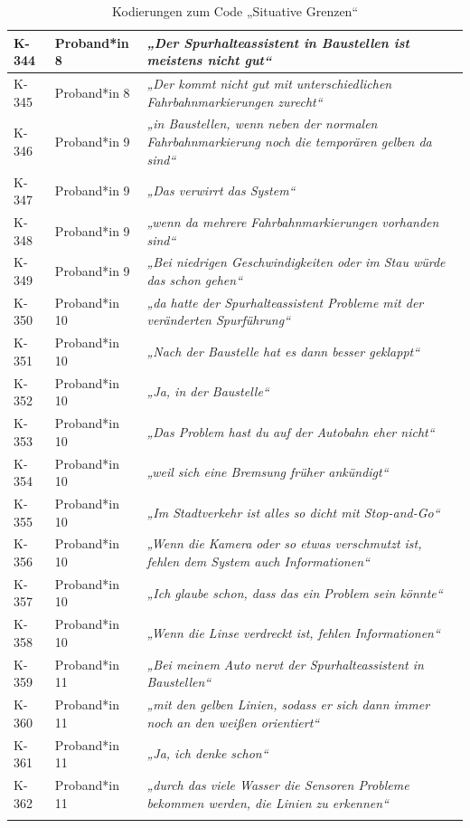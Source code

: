 {\begin{xltabular}{\textwidth}{
    |P{0.10\textwidth}
    |P{0.17\textwidth}
    |Y|
}
\hline
K-344 & Proband*in 8 & \textit{„Der Spurhalteassistent in Baustellen ist meistens nicht gut“} \\
\hline
K-345 & Proband*in 8 & \textit{„Der kommt nicht gut mit unterschiedlichen Fahrbahnmarkierungen zurecht“} \\
\hline
K-346 & Proband*in 9 & \textit{„in Baustellen, wenn neben der normalen Fahrbahnmarkierung noch die temporären gelben da sind“} \\
\hline
K-347 & Proband*in 9 & \textit{„Das verwirrt das System“} \\
\hline
K-348 & Proband*in 9 & \textit{„wenn da mehrere Fahrbahnmarkierungen vorhanden sind“} \\
\hline
K-349 & Proband*in 9 & \textit{„Bei niedrigen Geschwindigkeiten oder im Stau würde das schon gehen“} \\
\hline
K-350 & Proband*in 10 & \textit{„da hatte der Spurhalteassistent Probleme mit der veränderten Spurführung“} \\
\hline
K-351 & Proband*in 10 & \textit{„Nach der Baustelle hat es dann besser geklappt“} \\
\hline
K-352 & Proband*in 10 & \textit{„Ja, in der Baustelle“} \\
\hline
K-353 & Proband*in 10 & \textit{„Das Problem hast du auf der Autobahn eher nicht“} \\
\hline
K-354 & Proband*in 10 & \textit{„weil sich eine Bremsung früher ankündigt“} \\
\hline
K-355 & Proband*in 10 & \textit{„Im Stadtverkehr ist alles so dicht mit Stop-and-Go“} \\
\hline
K-356 & Proband*in 10 & \textit{„Wenn die Kamera oder so etwas verschmutzt ist, fehlen dem System auch Informationen“} \\
\hline
K-357 & Proband*in 10 & \textit{„Ich glaube schon, dass das ein Problem sein könnte“} \\
\hline
K-358 & Proband*in 10 & \textit{„Wenn die Linse verdreckt ist, fehlen Informationen“} \\
\hline
K-359 & Proband*in 11 & \textit{„Bei meinem Auto nervt der Spurhalteassistent in Baustellen“} \\
\hline
K-360 & Proband*in 11 & \textit{„mit den gelben Linien, sodass er sich dann immer noch an den weißen orientiert“} \\
\hline
K-361 & Proband*in 11 & \textit{„Ja, ich denke schon“} \\
\hline
K-362 & Proband*in 11 & \textit{„durch das viele Wasser die Sensoren Probleme bekommen werden, die Linien zu erkennen“} \\
\hline
\caption{Kodierungen zum Code „Situative Grenzen“}\label{tab:kodiernachweis-situative-grenzen}\\
\end{xltabular}
}

